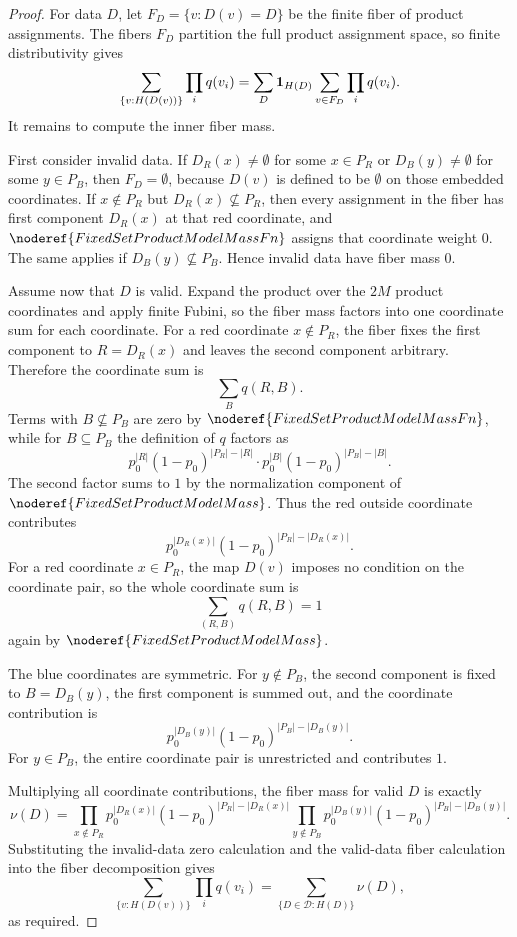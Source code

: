 \begin{proof}
For data \(D\), let \(F_D=\{v:D(v)=D\}\) be the finite fiber of product
assignments.  The fibers \(F_D\) partition the full product assignment space,
so finite distributivity gives
\[
\sum_{\{v:H(D(v))\}}\prod_i q(v_i)
=
\sum_D {\bf 1}_{H(D)}
   \sum_{v\in F_D}\prod_iq(v_i).
\]
It remains to compute the inner fiber mass.

First consider invalid data.  If \(D_R(x)\ne\emptyset\) for some \(x\in P_R\)
or \(D_B(y)\ne\emptyset\) for some \(y\in P_B\), then \(F_D=\emptyset\),
because \(D(v)\) is defined to be \(\emptyset\) on those embedded
coordinates.  If \(x\notin P_R\) but \(D_R(x)\not\subseteq P_R\), then every
assignment in the fiber has first component \(D_R(x)\) at that red coordinate,
and \(\noderef{FixedSetProductModelMassFn}\) assigns that coordinate weight
\(0\).  The same applies if \(D_B(y)\not\subseteq P_B\).  Hence invalid data
have fiber mass \(0\).

Assume now that \(D\) is valid.  Expand the product over the \(2M\) product
coordinates and apply finite Fubini, so the fiber mass factors into one
coordinate sum for each coordinate.  For a red coordinate \(x\notin P_R\), the
fiber fixes the first component to \(R=D_R(x)\) and leaves the second
component arbitrary.  Therefore the coordinate sum is
\[
\sum_B q(R,B).
\]
Terms with \(B\not\subseteq P_B\) are zero by
\(\noderef{FixedSetProductModelMassFn}\), while for \(B\subseteq P_B\) the
definition of \(q\) factors as
\[
p_0^{|R|}(1-p_0)^{|P_R|-|R|}
\cdot p_0^{|B|}(1-p_0)^{|P_B|-|B|}.
\]
The second factor sums to \(1\) by the normalization component of
\(\noderef{FixedSetProductModelMass}\).  Thus the red outside coordinate
contributes
\[
p_0^{|D_R(x)|}(1-p_0)^{|P_R|-|D_R(x)|}.
\]
For a red coordinate \(x\in P_R\), the map \(D(v)\) imposes no condition on
the coordinate pair, so the whole coordinate sum is
\[
\sum_{(R,B)}q(R,B)=1
\]
again by \(\noderef{FixedSetProductModelMass}\).

The blue coordinates are symmetric.  For \(y\notin P_B\), the second component
is fixed to \(B=D_B(y)\), the first component is summed out, and the
coordinate contribution is
\[
p_0^{|D_B(y)|}(1-p_0)^{|P_B|-|D_B(y)|}.
\]
For \(y\in P_B\), the entire coordinate pair is unrestricted and contributes
\(1\).

Multiplying all coordinate contributions, the fiber mass for valid \(D\) is
exactly
\[
\nu(D)=
\prod_{x\notin P_R}p_0^{|D_R(x)|}(1-p_0)^{|P_R|-|D_R(x)|}
\prod_{y\notin P_B}p_0^{|D_B(y)|}(1-p_0)^{|P_B|-|D_B(y)|}.
\]
Substituting the invalid-data zero calculation and the valid-data fiber
calculation into the fiber decomposition gives
\[
\sum_{\{v:H(D(v))\}}\prod_iq(v_i)
=
\sum_{\{D\in\mathcal D:H(D)\}}\nu(D),
\]
as required.
\end{proof}
